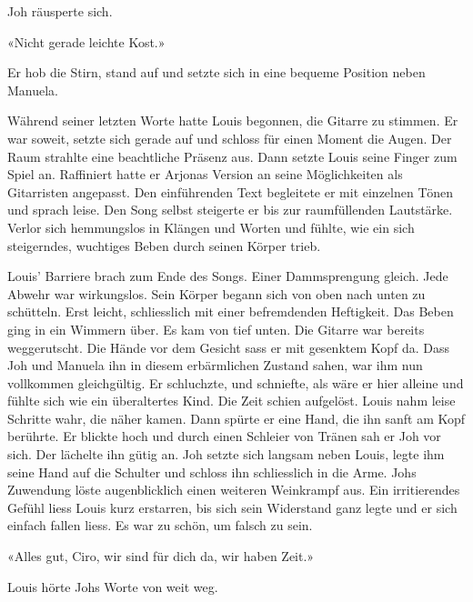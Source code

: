 Joh räusperte sich. 

«Nicht gerade leichte Kost.»

Er hob die Stirn, stand auf und setzte sich in eine bequeme Position neben Manuela.

Während seiner letzten Worte hatte Louis begonnen, die Gitarre zu stimmen. Er war soweit, 
setzte sich gerade auf und schloss für einen Moment die Augen. Der
Raum strahlte eine beachtliche Präsenz aus.
Dann setzte Louis seine Finger zum Spiel an. Raffiniert hatte er Arjonas
Version an seine Möglichkeiten als Gitarristen angepasst. Den 
einführenden Text begleitete er mit einzelnen Tönen und sprach leise.
Den Song selbst steigerte er bis zur raumfüllenden Lautstärke. Verlor
sich hemmungslos in Klängen und Worten und fühlte, wie ein sich
steigerndes, wuchtiges Beben durch seinen Körper trieb.


Louis’ Barriere brach zum Ende des Songs. Einer Dammsprengung gleich.
Jede Abwehr war wirkungslos. Sein Körper begann sich von oben nach unten
zu schütteln. Erst leicht, schliesslich mit einer befremdenden Heftigkeit. Das Beben ging in ein Wimmern über. Es kam von tief unten.
Die Gitarre war bereits weggerutscht. Die Hände vor dem Gesicht sass er mit gesenktem
Kopf da. Dass Joh und Manuela ihn in diesem erbärmlichen Zustand sahen,
war ihm nun vollkommen gleichgültig. Er schluchzte, und schniefte,
als wäre er hier alleine und fühlte sich wie ein überaltertes Kind. 
Die Zeit schien aufgelöst. Louis nahm leise Schritte wahr, die näher
kamen. Dann spürte er eine Hand, die ihn sanft am Kopf berührte. Er
blickte hoch und durch einen Schleier von Tränen sah er Joh vor sich.
Der lächelte ihn gütig an. Joh setzte sich langsam neben Louis, legte
ihm seine Hand auf die Schulter und schloss ihn schliesslich 
in die Arme. Johs Zuwendung löste augenblicklich einen
weiteren Weinkrampf aus. Ein irritierendes Gefühl liess Louis kurz
erstarren, bis sich sein Widerstand ganz legte und er sich einfach
fallen liess. Es war zu schön, um falsch zu sein. 

«Alles gut, Ciro, wir sind für dich da, wir haben Zeit.»

Louis hörte Johs Worte von weit weg.
